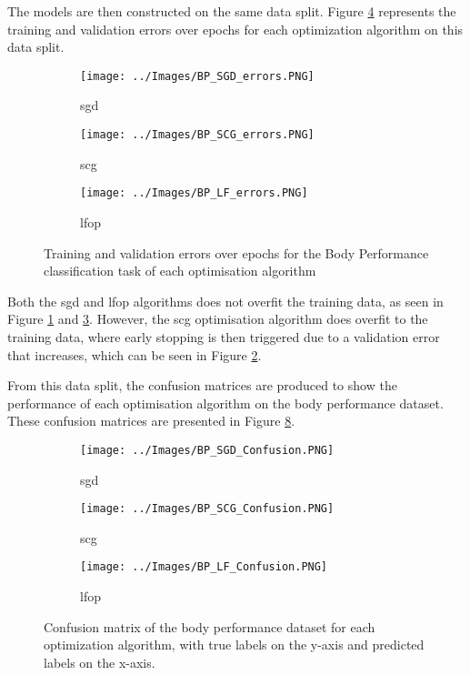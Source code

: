 \documentclass[10pt, conference]{IEEEtran}
\begin{document}
The models are then constructed on the same data split. Figure \ref{fig:BP_errors} represents
the training and validation errors over epochs for each optimization algorithm on this data split.
\begin{figure}[H]
    \centering
    \begin{subfigure}[b]{0.23\textwidth}
        \centering
        \texttt{[image: ../Images/BP\_SGD\_errors.PNG]}
        \caption{\acrshort{sgd}}
        \label{fig:BP_SGD_errors}
    \end{subfigure}
    \hfill
    \begin{subfigure}[b]{0.23\textwidth}
        \centering
        \texttt{[image: ../Images/BP\_SCG\_errors.PNG]}
        \caption{\acrshort{scg}}
        \label{fig:BP_SCG_errors}
    \end{subfigure}
    \begin{subfigure}[b]{0.23\textwidth}
        \centering
        \texttt{[image: ../Images/BP\_LF\_errors.PNG]}
        \caption{\acrshort{lfop}}
        \label{fig:BP_LF_errors}
    \end{subfigure}
    \caption{Training and validation errors over epochs for the Body Performance classification task of each optimisation algorithm}
    \label{fig:BP_errors}
\end{figure}
Both the \acrshort{sgd} and \acrshort{lfop} algorithms does not overfit the training data, as seen in Figure \ref{fig:BP_SGD_errors}
and \ref{fig:BP_LF_errors}. However, the \acrshort{scg} optimisation algorithm does overfit to the training data, where early
stopping is then triggered due to a validation error that increases, which can be seen in Figure \ref{fig:BP_SCG_errors}.

From this data split, the confusion matrices are produced to show the performance of each optimisation
algorithm on the body performance dataset. These confusion matrices are presented in Figure \ref{fig:BP_Classification}.
\begin{figure}[H]
    \centering
    \begin{subfigure}[b]{0.23\textwidth}
        \centering
        \texttt{[image: ../Images/BP\_SGD\_Confusion.PNG]}
        \caption{\acrshort{sgd}}
        \label{fig:BP_SGD_Classification}
    \end{subfigure}
    \hfill
    \begin{subfigure}[b]{0.23\textwidth}
        \centering
        \texttt{[image: ../Images/BP\_SCG\_Confusion.PNG]}
        \caption{\acrshort{scg}}
        \label{fig:BP_SCG_Classification}
    \end{subfigure}
    \begin{subfigure}[b]{0.23\textwidth}
        \centering
        \texttt{[image: ../Images/BP\_LF\_Confusion.PNG]}
        \caption{\acrshort{lfop}}
        \label{fig:BP_LF_Classification}
    \end{subfigure}
    \caption{Confusion matrix of the body performance dataset for each optimization algorithm, with true labels on the y-axis and predicted labels on the x-axis.}
    \label{fig:BP_Classification}
\end{figure}
\end{document}
